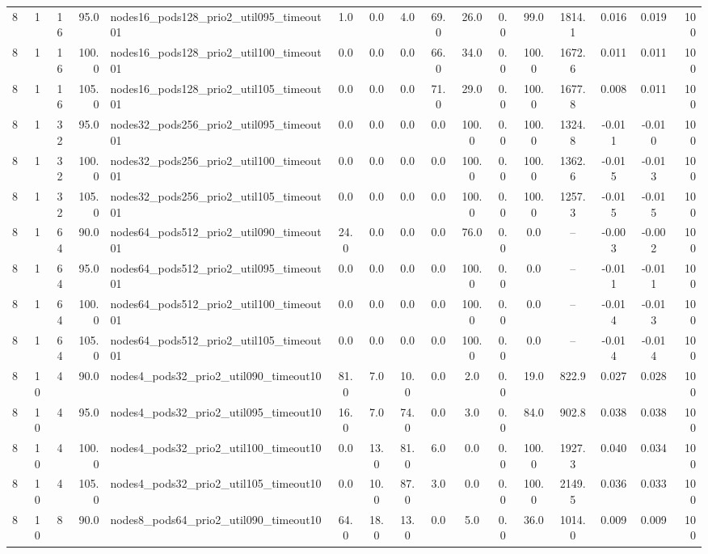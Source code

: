 \begin{tabular}{r r r r l c c c c c c c c c c r}
8 & 1 & 16 & 95.0 & nodes16\_pods128\_prio2\_util095\_timeout01 & 1.0 & 0.0 & 4.0 & 69.0 & 26.0 & 0.0 & 99.0 & 1814.1 & 0.016 & 0.019 & 100 \\
8 & 1 & 16 & 100.0 & nodes16\_pods128\_prio2\_util100\_timeout01 & 0.0 & 0.0 & 0.0 & 66.0 & 34.0 & 0.0 & 100.0 & 1672.6 & 0.011 & 0.011 & 100 \\
8 & 1 & 16 & 105.0 & nodes16\_pods128\_prio2\_util105\_timeout01 & 0.0 & 0.0 & 0.0 & 71.0 & 29.0 & 0.0 & 100.0 & 1677.8 & 0.008 & 0.011 & 100 \\
8 & 1 & 32 & 95.0 & nodes32\_pods256\_prio2\_util095\_timeout01 & 0.0 & 0.0 & 0.0 & 0.0 & 100.0 & 0.0 & 100.0 & 1324.8 & -0.011 & -0.010 & 100 \\
8 & 1 & 32 & 100.0 & nodes32\_pods256\_prio2\_util100\_timeout01 & 0.0 & 0.0 & 0.0 & 0.0 & 100.0 & 0.0 & 100.0 & 1362.6 & -0.015 & -0.013 & 100 \\
8 & 1 & 32 & 105.0 & nodes32\_pods256\_prio2\_util105\_timeout01 & 0.0 & 0.0 & 0.0 & 0.0 & 100.0 & 0.0 & 100.0 & 1257.3 & -0.015 & -0.015 & 100 \\
8 & 1 & 64 & 90.0 & nodes64\_pods512\_prio2\_util090\_timeout01 & 24.0 & 0.0 & 0.0 & 0.0 & 76.0 & 0.0 & 0.0 & -- & -0.003 & -0.002 & 100 \\
8 & 1 & 64 & 95.0 & nodes64\_pods512\_prio2\_util095\_timeout01 & 0.0 & 0.0 & 0.0 & 0.0 & 100.0 & 0.0 & 0.0 & -- & -0.011 & -0.011 & 100 \\
8 & 1 & 64 & 100.0 & nodes64\_pods512\_prio2\_util100\_timeout01 & 0.0 & 0.0 & 0.0 & 0.0 & 100.0 & 0.0 & 0.0 & -- & -0.014 & -0.013 & 100 \\
8 & 1 & 64 & 105.0 & nodes64\_pods512\_prio2\_util105\_timeout01 & 0.0 & 0.0 & 0.0 & 0.0 & 100.0 & 0.0 & 0.0 & -- & -0.014 & -0.014 & 100 \\
8 & 10 & 4 & 90.0 & nodes4\_pods32\_prio2\_util090\_timeout10 & 81.0 & 7.0 & 10.0 & 0.0 & 2.0 & 0.0 & 19.0 & 822.9 & 0.027 & 0.028 & 100 \\
8 & 10 & 4 & 95.0 & nodes4\_pods32\_prio2\_util095\_timeout10 & 16.0 & 7.0 & 74.0 & 0.0 & 3.0 & 0.0 & 84.0 & 902.8 & 0.038 & 0.038 & 100 \\
8 & 10 & 4 & 100.0 & nodes4\_pods32\_prio2\_util100\_timeout10 & 0.0 & 13.0 & 81.0 & 6.0 & 0.0 & 0.0 & 100.0 & 1927.3 & 0.040 & 0.034 & 100 \\
8 & 10 & 4 & 105.0 & nodes4\_pods32\_prio2\_util105\_timeout10 & 0.0 & 10.0 & 87.0 & 3.0 & 0.0 & 0.0 & 100.0 & 2149.5 & 0.036 & 0.033 & 100 \\
8 & 10 & 8 & 90.0 & nodes8\_pods64\_prio2\_util090\_timeout10 & 64.0 & 18.0 & 13.0 & 0.0 & 5.0 & 0.0 & 36.0 & 1014.0 & 0.009 & 0.009 & 100 \\

\end{tabular}
